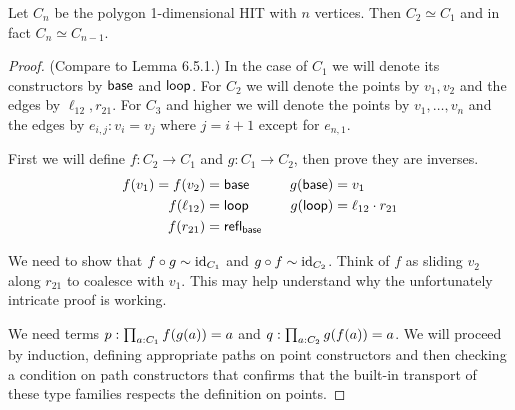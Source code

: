 \begin{mylemma}\label{lem:addpoints}
Let \( C_n \) be the polygon 1-dimensional HIT with \( n \) vertices. Then \( C_2\simeq C_1 \) and in fact \( C_n\simeq C_{n-1} \).
\end{mylemma}
\begin{proof}
(Compare to \cite{hottbook} Lemma 6.5.1.) In the case of \( C_1 \) we will denote its constructors by \( \mathsf{base} \) and \( \mathsf{loop} \). For \( C_2 \) we will denote the points by \( v_1, v_2 \) and the edges by \( \ell_{12}, r_{21} \). For \( C_3 \) and higher we will denote the points by \( v_1,\ldots,v_n \) and the edges by \( e_{i,j}:v_i=v_j \) where \( j=i+1 \) except for \( e_{n,1} \). 

First we will define \( f:C_2\to C_1 \) and \( g:C_1\to C_2 \), then prove they are inverses.
\begin{align*}
f(v_1)=f(v_2)&=\mathsf{base} &\quad g(\mathsf{base})&=v_1\\
f(\ell_{12})&=\mathsf{loop}&\quad g(\mathsf{loop})&=\ell_{12}\cdot r_{21}\\
f(r_{21}) &= \mathsf{refl}_{\mathsf{base}}& & \\
\end{align*}

We need to show that \( f\circ g\sim \text{id}_{C_1} \) and \( g\circ f\sim\text{id}_{C_2} \).
Think of \( f \) as sliding \( v_2 \) along \( r_{21} \) to coalesce with \( v_1 \). This may help understand why the unfortunately intricate proof is working.

We need terms \( p:\prod_{a:C_1}f(g(a))=a \) and \( q:\prod_{a:C_2}g(f(a))=a \). We will proceed by induction, defining appropriate paths on point constructors and then checking a condition on path constructors that confirms that the built-in transport of these type families respects the definition on points.


\end{proof}
